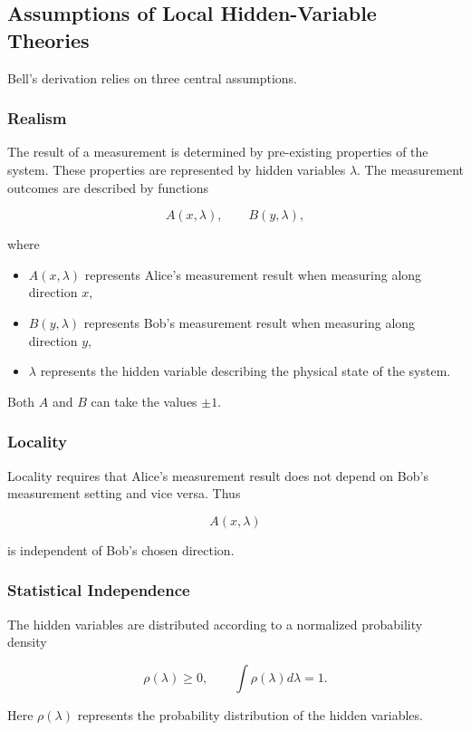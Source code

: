 \documentclass[17pt,a4paper]{extarticle}
\begin{document}
\subsection{Assumptions of Local Hidden-Variable Theories}

Bell’s derivation relies on three central assumptions.

\subsubsection{Realism}

The result of a measurement is determined by pre-existing properties of the system. These properties are represented by hidden variables $\lambda$. The measurement outcomes are described by functions

\[
A(x,\lambda), \qquad B(y,\lambda),
\]

where

\begin{itemize}
\item $A(x,\lambda)$ represents Alice's measurement result when measuring along direction $x$,
\item $B(y,\lambda)$ represents Bob's measurement result when measuring along direction $y$,
\item $\lambda$ represents the hidden variable describing the physical state of the system.
\end{itemize}

Both $A$ and $B$ can take the values $\pm1$.

\subsubsection{Locality}

Locality requires that Alice’s measurement result does not depend on Bob’s measurement setting and vice versa. Thus

\[
A(x,\lambda)
\]

is independent of Bob’s chosen direction.

\subsubsection{Statistical Independence}

The hidden variables are distributed according to a normalized probability density

\[
\rho(\lambda) \ge 0,
\qquad
\int \rho(\lambda) d\lambda = 1.
\]

Here $\rho(\lambda)$ represents the probability distribution of the hidden variables.
\end{document}
